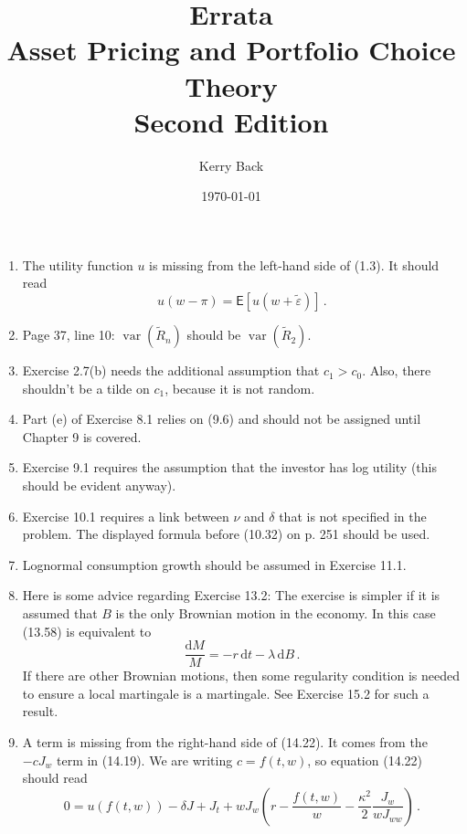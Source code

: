 \documentclass[11pt]{book}
\newcommand{\mye}{\ensuremath{\mathsf{E}}}
\newcommand{\D}{\mathrm{d}}
\theoremstyle{definition}
\DeclareMathOperator{\var}{var} \DeclareMathOperator{\stdev}{stdev}
\begin{document}
\VerbatimFootnotes



\author{Kerry Back}
\title{Errata\\ Asset Pricing and Portfolio Choice Theory\\
Second Edition\\
}
\date{\today}
\maketitle



\begin{enumerate}
\item The utility function $u$ is missing from the left-hand side of (1.3).  It should read 
$$u(w-\pi) = \mye[u(w+\tilde{\varepsilon})]\,.$$
\item Page 37, line 10: $\var(\tilde{R}_n)$ should be $\var(\tilde{R}_2)$.
\item Exercise 2.7(b) needs the additional assumption that $c_1>c_0$.  Also, there shouldn't be a tilde on $c_1$, because it is not random.
\item Part (e) of Exercise 8.1 relies on (9.6) and should not be assigned until Chapter 9 is covered.
\item Exercise 9.1 requires the assumption that the investor has log utility (this should be evident anyway).
\item Exercise 10.1 requires a link between $\nu$ and $\delta$ that is not specified in the problem.  The displayed formula before (10.32) on p. 251 should be used.
\item Lognormal consumption growth should be assumed in Exercise 11.1.
\item Here is some advice regarding Exercise 13.2: The exercise is simpler if it is assumed that $B$ is the only Brownian motion in the economy.  In this case (13.58) is equivalent to
	$$\frac{\D M}{M} = - r\,\D t - \lambda\,\D B\,.$$
	If there are other Brownian motions, then some regularity condition is needed to ensure a local martingale is a martingale.  See Exercise 15.2 for such a result.
	\item A term is missing from the right-hand side of (14.22).  It comes from the $-cJ_w$ term in (14.19).  We are writing $c=f(t,w)$, so equation (14.22) should read
	$$0 = u(f(t,w)) - \delta J + J_t + wJ_w \left(r - \frac{f(t,w)}{w} - \frac{\kappa^2}{2}\frac{J_w}{wJ_{ww}}\right)\,.$$

\end{enumerate}
\end{document}
